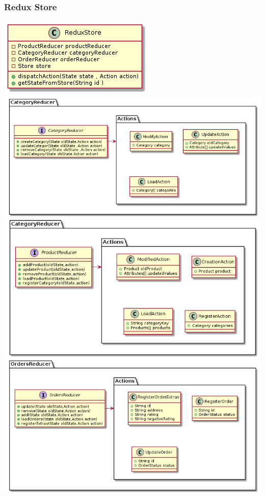 \documentclass{article}
\begin{document}
\subsubsection{Redux Store}
\includegraphics[scale=0.5]{./out/ReactApp/Application/ReduxStore/Store.png}\\
\includegraphics[scale=0.5]{./out/ReactApp/Application/ProductReducer/ProductReducer.png}\\
\includegraphics[scale=0.5]{./out/ReactApp/Application/CategoryReducer/CategoryReducer.png}\\
\includegraphics[scale=0.5]{./out/ReactApp/Application/OrdersReducer/OrdersReducer.png}\\
\end{document}
